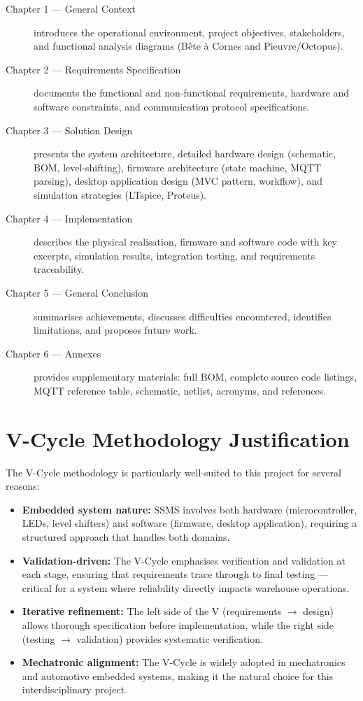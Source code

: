\begin{description}
  \item[Chapter 1 --- General Context] introduces the operational environment, project objectives, stakeholders, and functional analysis diagrams (B\^ete \`a Cornes and Pieuvre/Octopus).
  \item[Chapter 2 --- Requirements Specification] documents the functional and non-functional requirements, hardware and software constraints, and communication protocol specifications.
  \item[Chapter 3 --- Solution Design] presents the system architecture, detailed hardware design (schematic, BOM, level-shifting), firmware architecture (state machine, MQTT parsing), desktop application design (MVC pattern, workflow), and simulation strategies (LTspice, Proteus).
  \item[Chapter 4 --- Implementation] describes the physical realisation, firmware and software code with key excerpts, simulation results, integration testing, and requirements traceability.
  \item[Chapter 5 --- General Conclusion] summarises achievements, discusses difficulties encountered, identifies limitations, and proposes future work.
  \item[Chapter 6 --- Annexes] provides supplementary materials: full BOM, complete source code listings, MQTT reference table, schematic, netlist, acronyms, and references.
\end{description}

\section{V-Cycle Methodology Justification}
\label{sec:vcycle}

The V-Cycle methodology is particularly well-suited to this project for several reasons:

\begin{itemize}
  \item \textbf{Embedded system nature:} SSMS involves both hardware (microcontroller, LEDs, level shifters) and software (firmware, desktop application), requiring a structured approach that handles both domains.
  \item \textbf{Validation-driven:} The V-Cycle emphasises verification and validation at each stage, ensuring that requirements trace through to final testing --- critical for a system where reliability directly impacts warehouse operations.
  \item \textbf{Iterative refinement:} The left side of the V (requirements $\rightarrow$ design) allows thorough specification before implementation, while the right side (testing $\rightarrow$ validation) provides systematic verification.
  \item \textbf{Mechatronic alignment:} The V-Cycle is widely adopted in mechatronics and automotive embedded systems, making it the natural choice for this interdisciplinary project.
\end{itemize}

